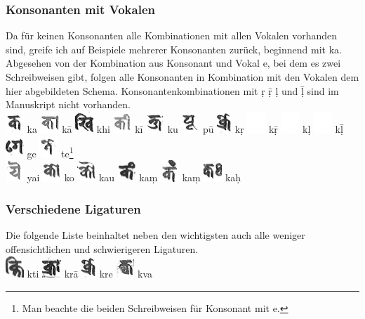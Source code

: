 \documentclass[a4paper,12pt]{article}
\begin{document}
{\subsubsection{Konsonanten mit Vokalen}

Da für keinen Konsonanten alle Kombinationen mit allen Vokalen vorhanden sind, greife ich auf Beispiele mehrerer Konsonanten zurück, beginnend mit ka. Abgesehen von der Kombination aus Konsonant und Vokal e, bei dem es zwei Schreibweisen gibt, folgen alle Konsonanten in Kombination mit den Vokalen dem hier abgebildeten Schema. Konsonantenkombinationen mit ṛ ṝ ḷ und ḹ sind im Manuskript nicht vorhanden. \hfill \break  
\linebreak
\\
\noindent
\includegraphics[height=8.0mm]{ka.jpg} ka \includegraphics[height=8.0mm]{kaa.jpg} kā \includegraphics[height=8.0mm]{khi.jpg} khi \includegraphics[height=8.0mm]{kii.jpg} kī \includegraphics[height=8.0mm]{ku.jpg} ku \includegraphics[height=8.0mm]{puu.jpg} pū \includegraphics[height=8.0mm]{kr.jpg} kṛ \includegraphics[height=8.0mm]{white.jpg} kṝ \includegraphics[height=8.0mm]{white.jpg} kḷ \includegraphics[height=8.0mm]{white.jpg} kḹ \includegraphics[height=8.0mm]{ge.jpg} ge \includegraphics[height=8.0mm]{te.jpg} te\footnote{Man beachte die beiden Schreibweisen für Konsonant mit e.} \\ \includegraphics[height=8.0mm]{yai.jpg} yai \includegraphics[height=8.0mm]{ko.jpg} ko \includegraphics[height=8.0mm]{kau.jpg} kau \includegraphics[height=8.0mm]{kam.jpg} kaṃ \includegraphics[height=8.0mm]{kam2.jpg} kaṃ \includegraphics[height=8.0mm]{kah.jpg} kaḥ 

\subsubsection{Verschiedene Ligaturen}

Die folgende Liste beinhaltet neben den wichtigsten auch alle weniger offensichtlichen und schwierigeren Ligaturen. \hfill \break
\linebreak
\\
\includegraphics[height=8.0mm]{kt.jpg} kti \includegraphics[height=8.0mm]{krā.jpg} krā \includegraphics[height=8.0mm]{kre.jpg} kre \includegraphics[height=8.0mm]{kva.jpg} kva}
\end{document}
